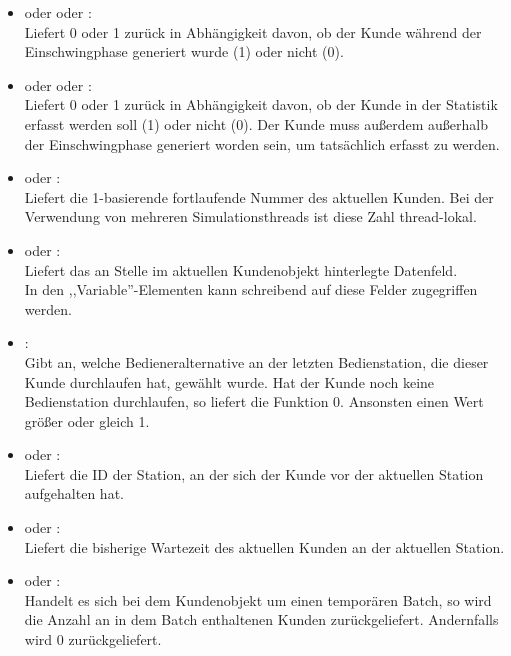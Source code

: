 \begin{itemize}

\item
{} oder  oder :\\
Liefert 0 oder 1 zurück in Abhängigkeit davon, ob der Kunde während der Einschwingphase generiert wurde (1) oder nicht (0).

\item
{} oder  oder :\\
Liefert 0 oder 1 zurück in Abhängigkeit davon, ob der Kunde in der Statistik erfasst werden soll (1) oder nicht (0). Der Kunde muss außerdem außerhalb der Einschwingphase generiert worden sein, um tatsächlich erfasst zu werden.

\item
{} oder :\\
Liefert die 1-basierende fortlaufende Nummer des aktuellen Kunden. Bei der Verwendung von mehreren Simulationsthreads ist diese Zahl thread-lokal.

\item
{} oder :\\
Liefert das an Stelle  im aktuellen Kundenobjekt hinterlegte Datenfeld.\\
In den ,,Variable''-Elementen kann schreibend auf diese Felder zugegriffen werden.

\item
{}:\\
Gibt an, welche Bedieneralternative an der letzten Bedienstation, die dieser Kunde durchlaufen hat, gewählt wurde. Hat der Kunde noch keine Bedienstation durchlaufen, so liefert die Funktion 0. Ansonsten einen Wert größer oder gleich 1.

\item
{} oder :\\
Liefert die ID der Station, an der sich der Kunde vor der aktuellen Station aufgehalten hat.

\item
{} oder :\\
Liefert die bisherige Wartezeit des aktuellen Kunden an der aktuellen Station.

\item
{} oder :\\
Handelt es sich bei dem Kundenobjekt um einen temporären Batch, so wird die Anzahl an in dem Batch enthaltenen Kunden zurückgeliefert. Andernfalls wird 0 zurückgeliefert.

\end{itemize}



